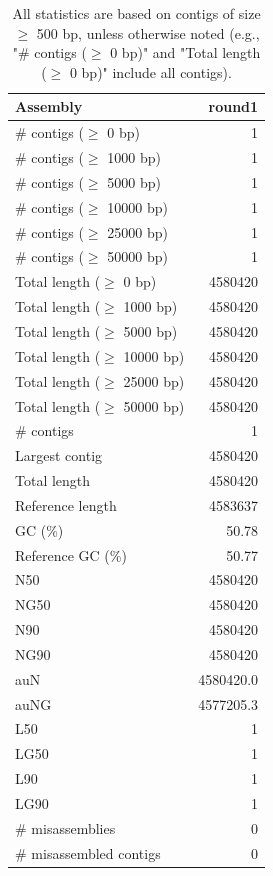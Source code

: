 \documentclass[12pt,a4paper]{article}
\begin{document}
\begin{table}[ht]
\begin{center}
\caption{All statistics are based on contigs of size $\geq$ 500 bp, unless otherwise noted (e.g., "\# contigs ($\geq$ 0 bp)" and "Total length ($\geq$ 0 bp)" include all contigs).}
\begin{tabular}{|l*{1}{|r}|}
\hline
Assembly & round1 \\ \hline
\# contigs ($\geq$ 0 bp) & 1 \\ \hline
\# contigs ($\geq$ 1000 bp) & 1 \\ \hline
\# contigs ($\geq$ 5000 bp) & 1 \\ \hline
\# contigs ($\geq$ 10000 bp) & 1 \\ \hline
\# contigs ($\geq$ 25000 bp) & 1 \\ \hline
\# contigs ($\geq$ 50000 bp) & 1 \\ \hline
Total length ($\geq$ 0 bp) & 4580420 \\ \hline
Total length ($\geq$ 1000 bp) & 4580420 \\ \hline
Total length ($\geq$ 5000 bp) & 4580420 \\ \hline
Total length ($\geq$ 10000 bp) & 4580420 \\ \hline
Total length ($\geq$ 25000 bp) & 4580420 \\ \hline
Total length ($\geq$ 50000 bp) & 4580420 \\ \hline
\# contigs & 1 \\ \hline
Largest contig & 4580420 \\ \hline
Total length & 4580420 \\ \hline
Reference length & 4583637 \\ \hline
GC (\%) & 50.78 \\ \hline
Reference GC (\%) & 50.77 \\ \hline
N50 & 4580420 \\ \hline
NG50 & 4580420 \\ \hline
N90 & 4580420 \\ \hline
NG90 & 4580420 \\ \hline
auN & 4580420.0 \\ \hline
auNG & 4577205.3 \\ \hline
L50 & 1 \\ \hline
LG50 & 1 \\ \hline
L90 & 1 \\ \hline
LG90 & 1 \\ \hline
\# misassemblies & 0 \\ \hline
\# misassembled contigs & 0 \\ \hline

\end{tabular}
\end{center}
\end{table}
\end{document}

